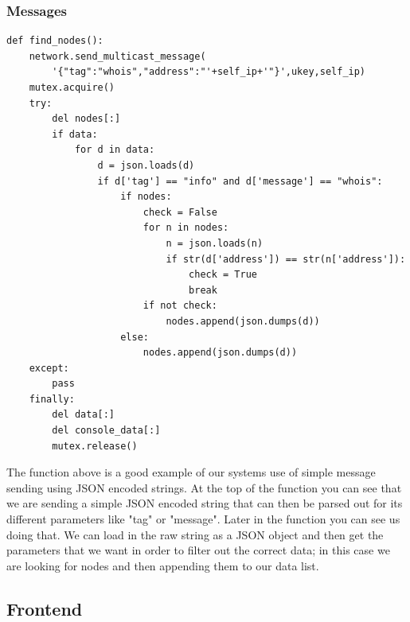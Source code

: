 \documentclass[draftclsnofoot, onecolumn, compsoc, 10pt]{IEEEtran}
\begin{document}
\subsubsection{Messages}
\begin{lstlisting}
def find_nodes():
	network.send_multicast_message(
		'{"tag":"whois","address":"'+self_ip+'"}',ukey,self_ip)
	mutex.acquire()
	try:
		del nodes[:]
		if data:
			for d in data:
				d = json.loads(d)
				if d['tag'] == "info" and d['message'] == "whois":
					if nodes:
						check = False
						for n in nodes:
							n = json.loads(n)
							if str(d['address']) == str(n['address']):
								check = True
								break
						if not check:
							nodes.append(json.dumps(d))
					else:
						nodes.append(json.dumps(d))
	except:
		pass
	finally:
		del data[:]
		del console_data[:]
		mutex.release()
\end{lstlisting}
The function above is a good example of our systems use of simple message sending using JSON encoded strings. At the top of the function you can see that we are sending a simple JSON encoded string that can then be parsed out for its different parameters like "tag" or "message". Later in the function you can see us doing that. We can load in the raw string as a JSON object and then get the parameters that we want in order to filter out the correct data; in this case we are looking for nodes and then appending them to our data list.

\subsection{Frontend}
\lstset{language=Java}
\end{document}
